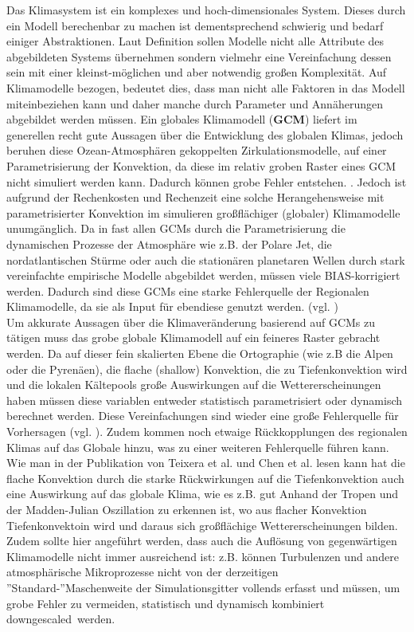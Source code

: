 Das Klimasystem ist ein komplexes und hoch-dimensionales System. Dieses durch ein Modell berechenbar zu machen ist dementsprechend schwierig und bedarf einiger Abstraktionen. Laut Definition \cite[vgl.][]{stachowiak} sollen Modelle nicht alle Attribute des abgebildeten Systems übernehmen sondern vielmehr eine Vereinfachung dessen sein mit einer kleinst-möglichen und aber notwendig großen Komplexität. Auf Klimamodelle bezogen, bedeutet dies, dass man nicht alle Faktoren in das Modell miteinbeziehen kann und daher manche durch Parameter und Annäherungen abgebildet werden müssen. Ein globales Klimamodell (\textbf{GCM}) liefert im generellen recht gute Aussagen über die Entwicklung des globalen Klimas, jedoch beruhen diese Ozean-Atmosphären gekoppelten Zirkulationsmodelle, auf einer Parametrisierung der Konvektion, da diese im relativ groben Raster eines GCM nicht simuliert werden kann. Dadurch können grobe Fehler entstehen. \cite[vgl.][Stevens \& Bony]{stevensbony}. Jedoch ist aufgrund der Rechenkosten und Rechenzeit eine solche Herangehensweise mit parametrisierter Konvektion im simulieren großflächiger (globaler) Klimamodelle  unumgänglich. Da in fast allen GCMs durch die Parametrisierung die dynamischen Prozesse der Atmosphäre wie z.B. der Polare Jet, die nordatlantischen Stürme oder auch die stationären planetaren Wellen durch stark vereinfachte empirische Modelle abgebildet werden, müssen viele BIAS-korrigiert werden. Dadurch sind diese GCMs eine starke Fehlerquelle der Regionalen Klimamodelle, da sie als Input für ebendiese genutzt werden. (vgl. \cite{woollings_2013})\\
Um akkurate Aussagen über die Klimaveränderung basierend auf GCMs zu tätigen muss das grobe globale Klimamodell auf ein feineres Raster gebracht werden. Da auf dieser fein skalierten Ebene die Ortographie (wie z.B die Alpen oder die Pyrenäen), die flache (shallow) Konvektion, die zu Tiefenkonvektion wird und die lokalen Kältepools große Auswirkungen auf die Wettererscheinungen haben müssen diese variablen entweder statistisch parametrisiert oder dynamisch berechnet werden. Diese Vereinfachungen sind wieder eine große Fehlerquelle für Vorhersagen (vgl. \cite{maraun_2010,casanueva_2013}). Zudem kommen noch etwaige Rückkopplungen des regionalen Klimas auf das Globale hinzu, was zu einer weiteren Fehlerquelle führen kann. Wie man in der Publikation von Teixera et al.\cite{teixeracardoso} und Chen et al.\cite{chenshuyi} lesen kann hat die flache Konvektion durch die starke Rückwirkungen auf die Tiefenkonvektion auch eine Auswirkung auf das globale Klima, wie es z.B. gut Anhand der Tropen  und der Madden-Julian Oszillation zu erkennen ist, wo aus flacher Konvektion Tiefenkonvektoin wird und daraus sich großflächige Wettererscheinungen bilden. Zudem sollte hier angeführt werden, dass auch die Auflösung von gegenwärtigen Klimamodelle nicht immer ausreichend ist: z.B. können Turbulenzen und andere atmosphärische Mikroprozesse nicht von der derzeitigen ''Standard-''Maschenweite der Simulationsgitter vollends erfasst und müssen, um grobe Fehler zu vermeiden, statistisch und dynamisch kombiniert \glqq downgescaled\grqq \ werden. \cite[vgl.][Maraun et al.]{marauntowards}\\
